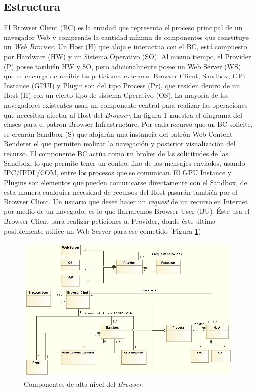 \subsection{Estructura}
El Browser Client (BC) es la entidad que representa el proceso principal de un navegador Web y comprende la cantidad mínima de componentes que constituye un \textit{Web Browser}. Un Host (H) que aloja e interactua con el BC, está compuesto por Hardware (HW) y un Sistema Operativo (SO). Al mismo tiempo, el Provider (P) posee también HW y SO, pero adicionalmente posee un Web Server (WS) que se encarga de recibir las peticiones externas. Browser Client, Sandbox, GPU Instance (GPUI) y Plugin son del tipo Process (Pr), que residen dentro de un Host (H) con un cierto tipo de sistema Operativo (OS). La mayoría de los navegadores existentes usan un componente central para realizar las operaciones que necesitan afectar al Host del \textit{Browser}. La figura \ref{fig:BIPatt} muestra el diagrama del clases para el patrón Browser Infrastructure. Por cada recurso que un BC solicite, se crearán Sandbox (S) que alojarán una instancia del patrón Web Content Renderer el que permiten realizar la navegación y posterior visualización del recurso.
El componente BC actúa como un broker de las solicitudes de las Sandbox, lo que permite tener un control fino de los mensajes enviados, usando IPC/IPDL/COM, entre los procesos que se comunican. El GPU Instance y Plugins son elementos que pueden comunicarse directamente con el Sandbox, de esta manera cualquier necesidad de recursos del Host pasarán también por el Browser Client. 
Un usuario que desee hacer un \textit{request} de un recurso en Internet por medio de un navegador es lo que llamaremos Browser User (BU). Éste usa el Browser Client para realizar peticiones al Provider, donde éste último posiblemente utilice un Web Server para ese cometido (Figura \ref{fig:BIPatt})
	\begin{landscape}
	    \begin{figure}[h!t]
	        \centering
	        \includegraphics[scale=0.73]{figures/chap4/browserInfraPattern_v3.jpg}
	        \caption{Componentes de alto nivel del \textit{Browser}.}
	        \label{fig:BIPatt}
	    \end{figure}
	\end{landscape}

